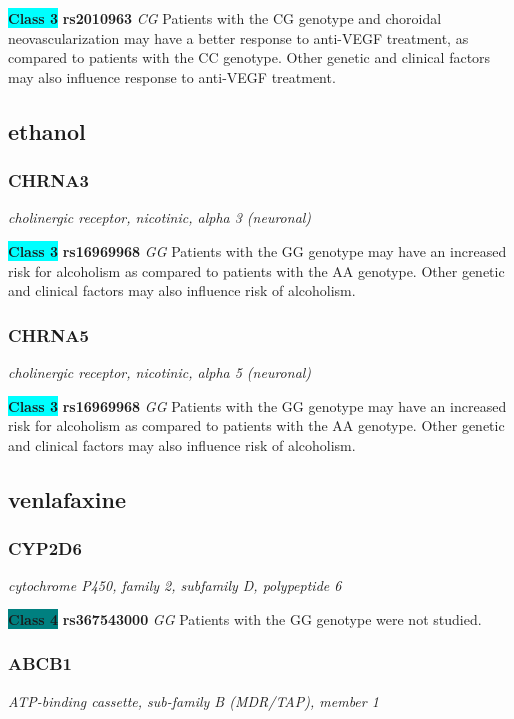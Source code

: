 \documentclass{report}
\begin{document}
\textbf{\colorbox{cyan} {Class 3}} \textbf{ rs2010963 } \textit{ CG }
Patients with the CG genotype and choroidal neovascularization may have a better response to anti-VEGF treatment, as compared to patients with the CC genotype. Other genetic and clinical factors may also influence response to anti-VEGF treatment. \newline\subsection{ ethanol }\subsubsection{ CHRNA3 }
\textit{ cholinergic receptor, nicotinic, alpha 3 (neuronal) }

\textbf{\colorbox{cyan} {Class 3}} \textbf{ rs16969968 } \textit{ GG }
Patients with the GG genotype may have an increased risk for alcoholism as compared to patients with the AA genotype. Other genetic and clinical factors may also influence risk of alcoholism.\newline\subsubsection{ CHRNA5 }
\textit{ cholinergic receptor, nicotinic, alpha 5 (neuronal) }

\textbf{\colorbox{cyan} {Class 3}} \textbf{ rs16969968 } \textit{ GG }
Patients with the GG genotype may have an increased risk for alcoholism as compared to patients with the AA genotype. Other genetic and clinical factors may also influence risk of alcoholism.\newline\subsection{ venlafaxine }\subsubsection{ CYP2D6 }
\textit{ cytochrome P450, family 2, subfamily D, polypeptide 6 }

\textbf{\colorbox{teal} {Class 4}} \textbf{ rs367543000 } \textit{ GG }
Patients with the GG genotype were not studied.\newline\subsubsection{ ABCB1 }
\textit{ ATP-binding cassette, sub-family B (MDR/TAP), member 1 }
\end{document}
